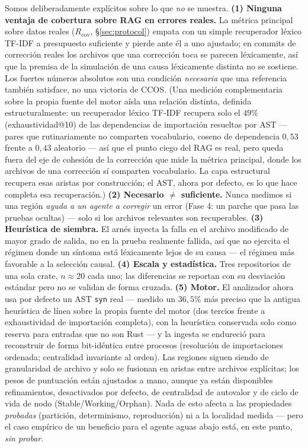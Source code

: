 \documentclass[11pt]{article}
\newcommand{\code}[1]{\texttt{#1}}
\begin{document}
Somos deliberadamente explícitos sobre lo que \emph{no} se muestra.
\textbf{(1) Ninguna ventaja de cobertura sobre RAG en errores reales.} La métrica
principal sobre datos reales ($R_{\mathrm{cov}}$, \S\ref{sec:protocol}) empata con un
simple recuperador léxico TF-IDF a presupuesto suficiente y pierde ante él a uno
ajustado; en commits de corrección reales los archivos que una corrección toca se
parecen léxicamente, así que la premisa de la simulación de una causa léxicamente
distinta no se sostiene. Los fuertes números absolutos son una condición
\emph{necesaria} que una referencia también satisface, no una victoria de CCOS.
(Una medición complementaria sobre la propia fuente del motor aísla una relación
distinta, definida estructuralmente: un recuperador léxico TF-IDF recupera solo el
$49\%$ (exhaustividad@10) de las dependencias de importación resueltas por AST ---
pares que rutinariamente no comparten vocabulario, coseno de dependencia $0{,}53$
frente a $0{,}43$ aleatorio --- así que el punto ciego del RAG es real, pero queda
fuera del eje de cohesión de la corrección que mide la métrica principal, donde los
archivos de una corrección sí comparten vocabulario. La capa estructural recupera
esas aristas por construcción; el AST, ahora por defecto, es lo que hace completa esa
recuperación.)
\textbf{(2) Necesario $\neq$ suficiente.} Nunca medimos si una región \emph{ayuda a un
agente a corregir} un error (Fase 4: un parche que pasa las pruebas ocultas) --- solo si
los archivos relevantes son recuperables.
\textbf{(3) Heurística de siembra.} El arnés inyecta la falla en el archivo modificado
de mayor grado de salida, no en la prueba realmente fallida, así que no ejercita el
régimen donde un síntoma está léxicamente lejos de su causa --- el régimen más favorable
a la selección causal.
\textbf{(4) Escala y estadística.} Tres repositorios de una sola crate,
$n\!\approx\!20$ cada uno; las diferencias se reportan con su desviación estándar pero no
se validan de forma cruzada.
\textbf{(5) Motor.} El analizador ahora usa por defecto un AST \code{syn} real ---
medido un $36{,}5\%$ más preciso que la antigua heurística de línea sobre la propia
fuente del motor (dos tercios frente a exhaustividad de importación completa), con la
heurística conservada solo como reserva para entradas que no son Rust --- y la
ingesta se endureció para reconstruir de forma bit-idéntica entre procesos
(resolución de importaciones ordenada; centralidad invariante al orden). Las regiones
siguen siendo de granularidad de archivo y solo se fusionan en aristas entre archivos
explícitas; los pesos de puntuación están ajustados a mano, aunque ya están
disponibles refinamientos, desactivados por defecto, de centralidad de autovalor y de
ciclo de vida de nodo (Stable/Working/Orphan). Nada de esto afecta a las propiedades
\emph{probadas} (partición, determinismo, reproducción) ni a la localidad medida ---
pero el caso empírico de un beneficio para el agente aguas abajo está, en este punto,
\emph{sin probar}.
\end{document}
